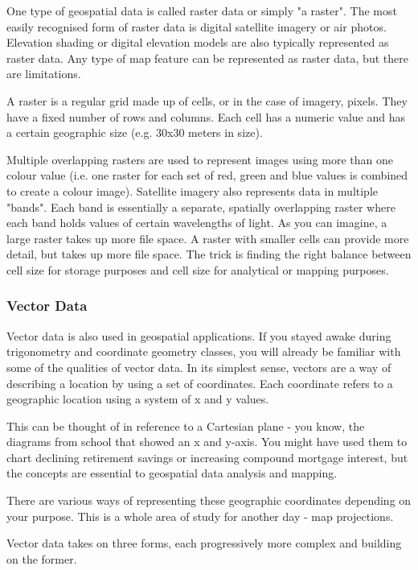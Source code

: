 One type of geospatial data is called raster data or simply "a raster". The
most easily recognised form of raster data is digital satellite imagery or
air photos. Elevation shading or digital elevation models are also
typically represented as raster data. Any type of map feature can be
represented as raster data, but there are limitations.

A raster is a regular grid made up of cells, or in the case of imagery,
pixels. They have a fixed number of rows and columns. Each cell has a
numeric value and has a certain geographic size (e.g. 30x30 meters in
size).

Multiple overlapping rasters are used to represent images using more than
one colour value (i.e. one raster for each set of red, green and blue
values is combined to create a colour image). Satellite imagery also
represents data in multiple "bands". Each band is essentially a separate,
spatially overlapping raster where each band holds values of certain
wavelengths of light. As you can imagine, a large raster takes up more file
space. A raster with smaller cells can provide more detail, but takes up
more file space. The trick is finding the right balance between cell size
for storage purposes and cell size for analytical or mapping purposes.

\subsubsection{Vector Data}\label{label_vectordata}

Vector data is also used in geospatial applications. If you stayed awake
during trigonometry and coordinate geometry classes, you will already be
familiar with some of the qualities of vector data. In its simplest sense,
vectors are a way of describing a location by using a set of coordinates.
Each coordinate refers to a geographic location using a system of x and y
values.

This can be thought of in reference to a Cartesian plane - you know, the
diagrams from school that showed an x and y-axis. You might have used them
to chart declining retirement savings or increasing compound mortgage
interest, but the concepts are essential to geospatial data analysis and
mapping.

There are various ways of representing these geographic coordinates
depending on your purpose. This is a whole area of study for another day -
map projections.

Vector data takes on three forms, each progressively more complex and
building on the former.  

